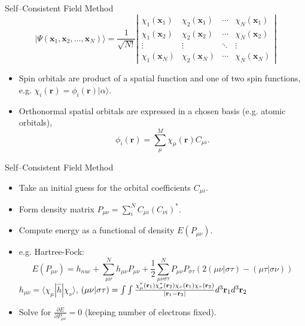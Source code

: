 \documentclass{beamer}
\newcommand{\dbd}[2] {{\frac{\partial #1}{\partial #2}}}
\newcommand{\braket}[3] {{\langle #1 | #2 | #3 \rangle}}
\newcommand{\ket}[1] {{| #1 \rangle}}
\def\bfr{{\bf r}}
\begin{document}
\begin{frame}{Self--Consistent Field Method}
 $$\ket{\Psi(\mathbf{x}_1, \mathbf{x}_2, \ldots, \mathbf{x}_N)} =
 \frac{1}{\sqrt{N!}} \left|
   \begin{matrix} \chi_1(\mathbf{x}_1) & \chi_2(\mathbf{x}_1) & \cdots & \chi_N(\mathbf{x}_1) \\
                      \chi_1(\mathbf{x}_2) & \chi_2(\mathbf{x}_2) & \cdots & \chi_N(\mathbf{x}_2) \\
                      \vdots & \vdots & \ddots & \vdots \\
                      \chi_1(\mathbf{x}_N) & \chi_2(\mathbf{x}_N) & \cdots & \chi_N(\mathbf{x}_N)
   \end{matrix} \right|$$
 \begin{itemize}
  \item<1-> Spin orbitals are product of a spatial function and one of two spin functions, e.g. $\chi_i(\mathbf{r}) = \phi_i(\mathbf{r}) \ket{\alpha}$.

  \item<2-> Orthonormal spatial orbitals are expressed in a chosen basis (e.g. atomic orbitals),
  $$\phi_i(\mathbf{r})=\sum_\mu^M\chi_\mu(\mathbf{r}) C_{\mu i}.$$
  \end{itemize}
\end{frame}

\begin{frame}{Self--Consistent Field Method}
 \begin{itemize}
  \item<1-> Take an initial guess for the orbital coefficients $C_{\mu i}$.
  \item<2-> Form density matrix $P_{\mu\nu}=\sum_i^N C_{\mu i} (C_{\nu i})^{*}$.
  \item<3-> Compute energy as a functional of density $E(P_{\mu\nu})$.
  \item<3-> e.g. Hartree-Fock: 
  $$E(P_{\mu\nu}) = h_{nuc} + \sum_{\mu\nu}^N h_{\mu\nu} P_{\mu\nu} + \frac{1}{2} \sum_{\mu\nu\sigma\tau}^N P_{\mu\nu} P_{\sigma\tau} \left(2\left(\mu\nu|\sigma\tau\right) - \left(\mu\tau|\sigma\nu\right)\right)$$
  $h_{\mu\nu}=\braket{\chi_\mu}{\hat{h}}{\chi_\nu}$, $\left(\mu\nu|\sigma\tau\right)=\int\int\frac{\chi_\mu^*(\bfr_1)\chi^*_\sigma(\bfr_2)\chi_\nu(\bfr_1)\chi_\tau(\bfr_2)}{|\bfr_1-\bfr_2|}d^3\bfr_1d^3\bfr_2$
  \item<4-> Solve for $\dbd{E}{P_{\mu\nu}}=0$ (keeping number of electrons fixed).
 \end{itemize}
\end{frame}
\end{document}
